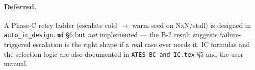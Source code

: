 \documentclass[english,a4paper]{kiseon_memo}
\begin{document}
\paragraph{Deferred.} A Phase-C retry ladder (escalate cold $\to$ warm seed on
NaN/stall) is designed in \texttt{auto\_ic\_design.md} \S6 but \emph{not}
implemented --- the B-2 result suggests failure-triggered escalation is the
right shape if a real case ever needs it. IC formulas and the selection logic
are also documented in \texttt{ATES\_BC\_and\_IC.tex} \S5 and the user manual.
\end{document}
